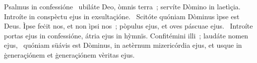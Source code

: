 { Psalmus in confessióne}
{%
~ubiláte Deo, òmnis terra~; servíte Dòmino in laetìçia. Introíte in conspèctu ejus in exsultaçióne. 
~Scitóte quóniam Dòminus ìpse est Deus. Ìpse feċit nos, et non ìpsi nos~; pòpulus ejus, et oves páscuae ejus. 
~Introíte portas ejus in confessióne, átria ejus in hỳmnïs. Confitémini illi~; laudáte nomen ejus, 
~quóniam süávis est Dòminus, in aetèrnum mizericórdia ejus, et usque in ġeneraçiónem et ġeneraçiónem vèritas ejus. 
}
